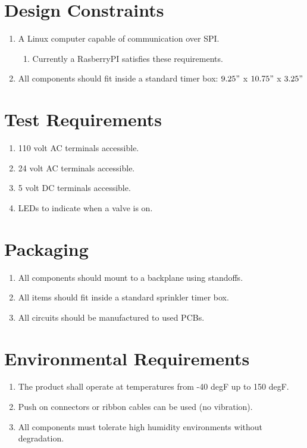 \documentclass[12pt,letterpaper]{article}
\begin{document}
\section{Design Constraints}

\begin{enumerate}
	\item A Linux computer capable of communication over SPI.
	\begin{enumerate}
		\item Currently a RasberryPI\autocite{rpi} satisfies these requirements.
	\end{enumerate}
	\item All components should fit inside a standard timer box:
		$9.25"$ x $10.75"$ x $3.25"$
\end{enumerate}

\section{Test Requirements}

\begin{enumerate}
	\item 110 volt AC terminals accessible.
	\item 24 volt AC terminals accessible.
	\item 5 volt DC terminals accessible.
	\item LEDs to indicate when a valve is on.
\end{enumerate}

\section{Packaging}

\begin{enumerate}
	\item All components should mount to a backplane using standoffs.
	\item All items should fit inside a standard sprinkler timer box.
	\item All circuits should be manufactured to used PCBs.
\end{enumerate}

\section{Environmental Requirements}

\begin{enumerate}
\item The product shall operate at temperatures from -40 degF
		up to 150 degF.
\item Push on connectors or ribbon cables can be used (no vibration).
\item All components must tolerate high humidity environments without
	degradation.
\end{enumerate}
\end{document}
